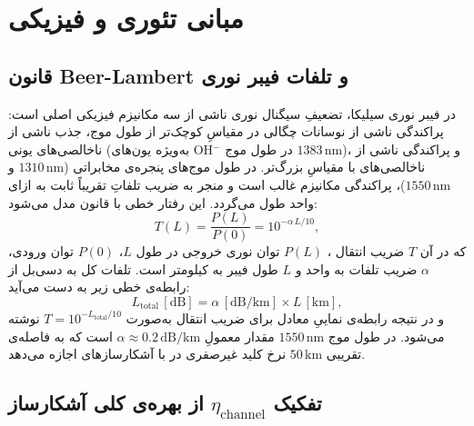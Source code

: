\section{مبانی تئوری و فیزیکی}
\label{sec:channel-theory}

\subsection{قانون Beer-Lambert و تلفات فیبر نوری}

در فیبر نوری سیلیکا، تضعیفِ سیگنال نوری ناشی از سه مکانیزم فیزیکی اصلی است: پراکندگی  ناشی از نوسانات چگالی در مقیاسِ کوچک‌تر از طول موج، جذب ناشی از ناخالصی‌های یونی (به‌ویژه یون‌های OH$^-$ در طول موج $1383\,\text{nm}$)، و پراکندگی  ناشی از ناخالصی‌های با مقیاسِ بزرگ‌تر. در طول موج‌های پنجره‌ی مخابراتی ($1310\,\text{nm}$ و $1550\,\text{nm}$)، پراکندگی  مکانیزم غالب است و منجر به ضریب تلفاتِ تقریباً ثابت به ازای واحد طول می‌گردد. این رفتار خطی با قانون  مدل می‌شود:
\begin{equation}
	T(L) = \frac{P(L)}{P(0)} = 10^{-\alpha\,L/10},
	\label{eq:beer-lambert}
\end{equation}
که در آن $T$ ضریب انتقال ، $P(L)$ توان نوری خروجی در طول $L$، $P(0)$ توان ورودی، $\alpha$ ضریب تلفات به واحد  و $L$ طول فیبر به کیلومتر است. تلفات کل به دسی‌بل از رابطه‌ی خطی زیر به دست می‌آید:
\begin{equation}
	L_{\text{total}}\,[\text{dB}] = \alpha\,[\text{dB/km}] \times L\,[\text{km}],
	\label{eq:total-loss-linear}
\end{equation}
و در نتیجه رابطه‌ی نماییِ معادل برای ضریب انتقال به‌صورت $T = 10^{-L_{\text{total}}/10}$ نوشته می‌شود. در طول موج $1550\,\text{nm}$ مقدار معمولِ $\alpha \approx 0.2\,\text{dB/km}$ است که به فاصله‌ی تقریبی $50\,\text{km}$ نرخ کلید غیرصفری در  با آشکارسازهای  اجازه می‌دهد.

\subsection{تفکیک $\eta_{\text{channel}}$ از بهره‌ی کلی آشکارساز}

